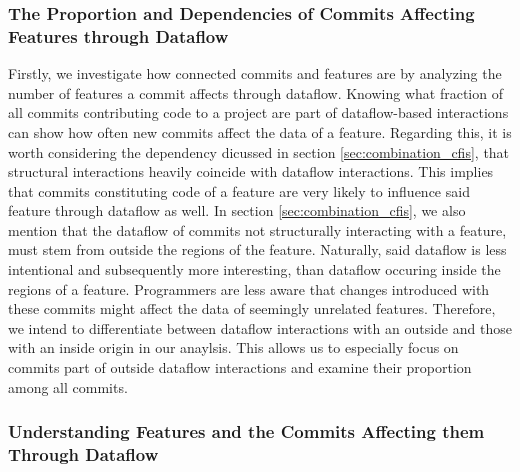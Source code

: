\subsubsection*{The Proportion and Dependencies of Commits Affecting Features through Dataflow}

Firstly, we investigate how connected commits and features are by analyzing the number of features a commit affects through dataflow.
Knowing what fraction of all commits contributing code to a project are part of dataflow-based interactions can show how often new commits affect the data of a feature. 
Regarding this, it is worth considering the dependency dicussed in section \ref{sec:combination_cfis}, that structural interactions heavily coincide with dataflow interactions.
This implies that commits constituting code of a feature are very likely to influence said feature through dataflow as well.
In section \ref{sec:combination_cfis}, we also mention that the dataflow of commits not structurally interacting with a feature, must stem from outside the regions of the feature. 
Naturally, said dataflow is less intentional and subsequently more interesting, than dataflow occuring inside the regions of a feature. 
Programmers are less aware that changes introduced with these commits might affect the data of seemingly unrelated features.
Therefore, we intend to differentiate between dataflow interactions with an outside and those with an inside origin in our anaylsis.
This allows us to especially focus on commits part of outside dataflow interactions and examine their proportion among all commits. 

\subsubsection*{Understanding Features and the Commits Affecting them Through Dataflow}

